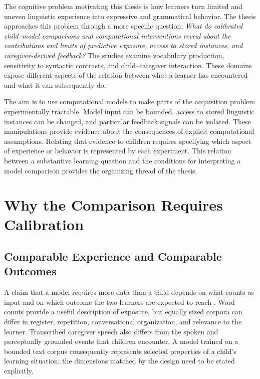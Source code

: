 The cognitive problem motivating this thesis is how learners turn limited and uneven linguistic experience into expressive and grammatical behavior. The thesis approaches this problem through a more specific question: \emph{What do calibrated child--model comparisons and computational interventions reveal about the contributions and limits of predictive exposure, access to stored instances, and caregiver-derived feedback?} The studies examine vocabulary production, sensitivity to syntactic contrasts, and child--caregiver interaction. These domains expose different aspects of the relation between what a learner has encountered and what it can subsequently do.

The aim is to use computational models to make parts of the acquisition problem experimentally tractable. Model input can be bounded, access to stored linguistic instances can be changed, and particular feedback signals can be isolated. These manipulations provide evidence about the consequences of explicit computational assumptions. Relating that evidence to children requires specifying which aspect of experience or behavior is represented by each experiment. This relation between a substantive learning question and the conditions for interpreting a model comparison provides the organizing thread of the thesis.

\section{Why the Comparison Requires Calibration}
\label{sec:intro:calibration}

\subsection{Comparable Experience and Comparable Outcomes}

A claim that a model requires more data than a child depends on what counts as input and on which outcome the two learners are expected to reach \citep{frank2023bridging}. Word counts provide a useful description of exposure, but equally sized corpora can differ in register, repetition, conversational organization, and relevance to the learner. Transcribed caregiver speech also differs from the spoken and perceptually grounded events that children encounter. A model trained on a bounded text corpus consequently represents selected properties of a child's learning situation; the dimensions matched by the design need to be stated explicitly.

